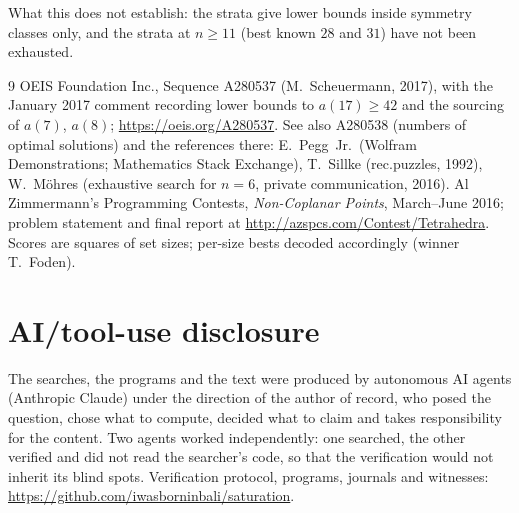 \documentclass[11pt,a4paper]{article}
\begin{document}
What this does not establish: the strata give lower bounds inside symmetry classes only, and the
strata at $n\ge11$ (best known $28$ and $31$) have not been exhausted.

\begin{thebibliography}{9}
 OEIS Foundation Inc., Sequence A280537 (M.~Scheuermann, 2017), with the
January 2017 comment recording lower bounds to $a(17)\ge42$ and the sourcing of $a(7)$, $a(8)$;
\url{https://oeis.org/A280537}.  See also A280538 (numbers of optimal solutions) and the
references there: E.~Pegg~Jr.\ (Wolfram Demonstrations; Mathematics Stack Exchange), T.~Sillke
(rec.puzzles, 1992), W.~M\"ohres (exhaustive search for $n=6$, private communication, 2016).
 Al Zimmermann's Programming Contests, \emph{Non-Coplanar Points}, March--June
2016; problem statement and final report at \url{http://azspcs.com/Contest/Tetrahedra}.  Scores
are squares of set sizes; per-size bests decoded accordingly (winner T.~Foden).
\end{thebibliography}

\section*{AI/tool-use disclosure}
The searches, the programs and the text were produced by autonomous AI agents (Anthropic Claude)
under the direction of the author of record, who posed the question, chose what to compute,
decided what to claim and takes responsibility for the content.  Two agents worked independently:
one searched, the other verified and did not read the searcher's code, so that the verification
would not inherit its blind spots.  Verification protocol, programs, journals and witnesses:
\url{https://github.com/iwasborninbali/saturation}.
\end{document}
